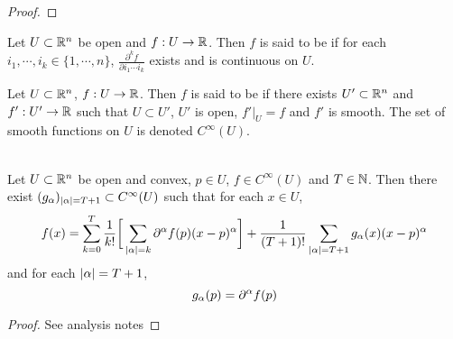 \documentclass{book}
\begin{document}
	\begin{proof}
		
	\end{proof}

	\begin{defn} 
		Let $U \subset \mathbb{R}^n$ be open and $f: U \rightarrow \mathbb{R}$. Then $f$ is said to be  if for each $i_1, \cdots, i_k \in \{1, \cdots, n\}$, $\frac{\partial^k f}{\partial i_1 \cdots i_k}$ exists and is continuous on $U$.
	\end{defn}

	\begin{defn} 
		Let $U \subset \mathbb{R}^n$, $f: U \rightarrow \mathbb{R}$. Then $f$ is said to be  if there exists $U' 
		\subset \mathbb{R}^n$ and $f':U' \rightarrow \mathbb{R}$ such that $U \subset U'$, $U'$ is open, $f'|_U = f$ and $f'$ is smooth. The set of smooth functions on $U$ is denoted $C^{\infty}(U)$.
	\end{defn}


	\begin{thm}  \\  
		Let $U \subset \mathbb{R}^n$ be open and convex, $p \in U$, $f \in C^{\infty}(U)$ and $T \in \mathbb{N}$. Then there exist $(g_{\alpha})_{|\alpha| = T+1} \subset C^{\infty}(U)$ such that for each $x \in U$, 
		$$f(x) = \sum_{k=0}^{T} \frac{1}{k!}\bigg[\sum_{|\alpha| = k} \partial^{\alpha} f (p) (x - p)^{\alpha}  \bigg] + \frac{1}{(T+1)!}\sum_{|\alpha| = T+1} g_{\alpha}(x) (x - p)^{\alpha} $$ and for each $|\alpha|= T+1$, $$g_{\alpha}(p) = \partial^{\alpha} f(p)$$
	\end{thm}
	
	\begin{proof}
	See analysis notes
	\end{proof}

\end{document}

